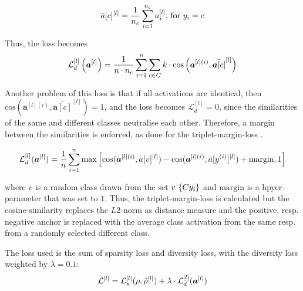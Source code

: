 \begin{equation}\eqlbl{vso_8}
		\bar{a}[c]^{[l]} = \frac{1}{n_c} \sum_{i=1}^{n_c} a^{[l]}_i \text{, for } y_i = c
\end{equation}

Thus, the loss becomes
\begin{equation}\eqlbl{vso_80}
		\mathcal{L}^{[l]}_{d} \left(\boldsymbol{a}^{[l]} \right) = \frac{1}{n\cdot n_c} \sum_{i=1}^{n} \sum_{c \in C} k \cdot \text{cos} \left( \boldsymbol{a}^{[l](i)}, \bar{\boldsymbol{a}[c]}^{[l]} \right)
\end{equation}

Another problem of this loss is that if all activations are identical, then $\text{cos} \left(\boldsymbol{a}^{[l](i)}, \bar{\boldsymbol{a}[c]}^{[l]} \right) = 1$, and the loss becomes $\mathcal{L}^{[l]}_{d}=0$, since the similarities of the same and different classes neutralise each other.
Therefore, a margin between the similarities is enforced, as done for the triplet-margin-loss  .

\begin{equation}\eqlbl{vso_9}
		\mathcal{L}^{[l]}_{d}(\boldsymbol{a}^{[l]}) = \frac{1}{n} \sum_{i=1}^{n} \max \left[ \text{cos}(\boldsymbol{a}^{[l](i)}, \bar{a}[v]^{[l]}) - \text{cos}(\boldsymbol{a}^{[l](i)}, \bar{a}[y^{(i)}]^{[l]}) + \text{margin}, 1 \right]
\end{equation}

where $v$ is a random class drawn from the set $v ~ \{C \\ y_i\}$ and $\text{margin}$ is a hpyer-parameter that was set to $1$.
Thus, the triplet-margin-loss is calculated but the cosine-similarity replaces the $L2$-norm as distance measure and the positive, resp. negative anchor is replaced with the average class activation from the same resp. from a randomly selected different class.

The loss used is the sum of sparsity loss and diversity loss, with the diversity loss weighted by $\lambda=0.1$:
\begin{equation}\eqlbl{vso_10}
		\mathcal{L}^{[l]} =\mathcal{L}^{[l]}_{s}(\rho, \hat{\rho}^{[l]}) 
 + \lambda \cdot \mathcal{L}^{[l]}_{d}(\boldsymbol{a}^{[l]})
\end{equation}


